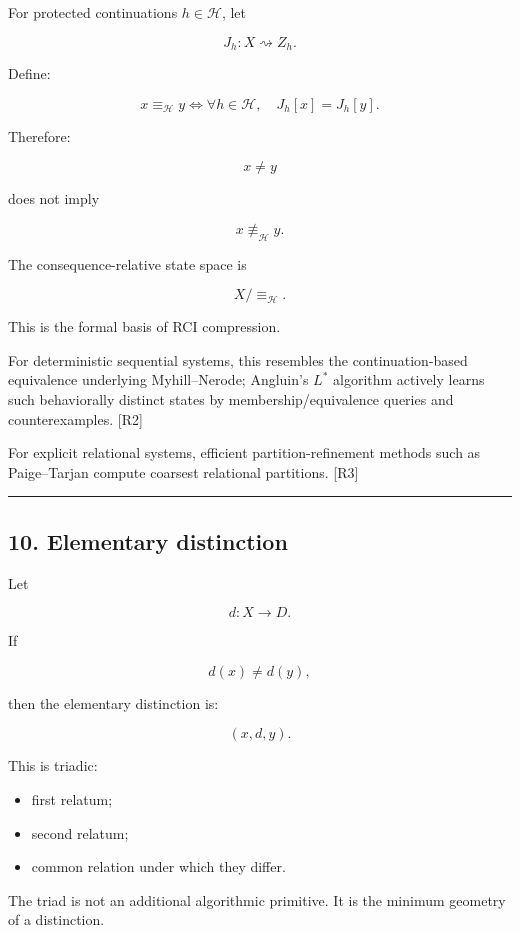 \documentclass[
]{article}
\providecommand{\tightlist}{%
  \setlength{\itemsep}{0pt}\setlength{\parskip}{0pt}}
\begin{document}
For protected continuations \(h\in\mathcal H\), let

\[
J_h:X\rightsquigarrow Z_h.
\]

Define:

\[
\boxed{
x\equiv_{\mathcal H}y
\iff
\forall h\in\mathcal H,
\quad
J_h[x]=J_h[y].
}
\]

Therefore:

\[
x\neq y
\]

does not imply

\[
x\not\equiv_{\mathcal H}y.
\]

The consequence-relative state space is

\[
\boxed{
X/{\equiv_{\mathcal H}}.
}
\]

This is the formal basis of RCI compression.

For deterministic sequential systems, this resembles the
continuation-based equivalence underlying Myhill--Nerode; Angluin's
\(L^*\) algorithm actively learns such behaviorally distinct states by
membership/equivalence queries and counterexamples. {[}R2{]}

For explicit relational systems, efficient partition-refinement methods
such as Paige--Tarjan compute coarsest relational partitions. {[}R3{]}

\begin{center}\rule{0.5\linewidth}{0.5pt}\end{center}

\subsection{10. Elementary distinction}\label{elementary-distinction}

Let

\[
d:X\to D.
\]

If

\[
d(x)\neq d(y),
\]

then the elementary distinction is:

\[
\boxed{
(x,d,y).
}
\]

This is triadic:

\begin{itemize}
\tightlist
\item
  first relatum;
\item
  second relatum;
\item
  common relation under which they differ.
\end{itemize}

The triad is not an additional algorithmic primitive. It is the minimum
geometry of a distinction.
\end{document}
